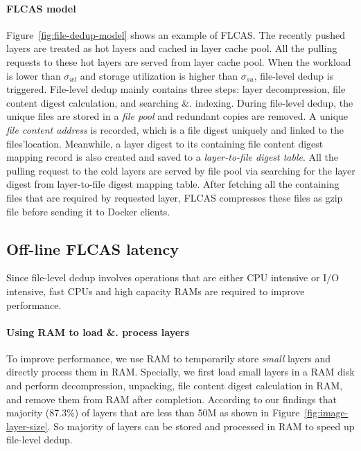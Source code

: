\paragraph{FLCAS model}
Figure~\ref{fig:file-dedup-model} shows an example of FLCAS.
%
%
The recently pushed layers are treated as hot layers and cached in layer cache pool. 
All the pulling requests to these hot layers are served from layer cache pool.
When the workload is lower than $\sigma_{wl}$ and storage utilization is higher than $\sigma_{su}$, file-level dedup is triggered. 
File-level dedup mainly contains three steps: layer decompression, file content digest calculation, and searching \&. indexing.
During file-level dedup, the unique files are stored in a \textit{file pool} and redundant copies are removed.  
A unique \textit{file content address} is recorded, which is a
file digest uniquely and linked to the files'location.
Meanwhile, a layer digest to its containing file content digest mapping record is also created and saved to a \textit{layer-to-file digest table}. 
 All the pulling request to the cold layers are served by file pool via searching for the layer digest from layer-to-file digest mapping table. After fetching all the containing files that are required by requested layer, FLCAS compresses these files as gzip file before sending it to Docker clients.         

\subsection{Off-line FLCAS latency} 

Since file-level dedup involves operations that are either CPU intensive or I/O intensive, fast CPUs and high capacity RAMs are required to improve performance.

\paragraph{Using RAM to load \&. process layers}

To improve performance, we use RAM to temporarily store \textit{small} layers and directly process them in RAM.
Specially, we first load small layers in a RAM disk and perform decompression, unpacking, file content digest calculation in RAM, and remove them from RAM after completion.   
According to our findings that majority (87.3\%) of layers that are less than 50M as shown in Figure~\ref{fig:image-layer-size}. So majority of layers can be stored and processed in RAM to speed up file-level dedup. 

